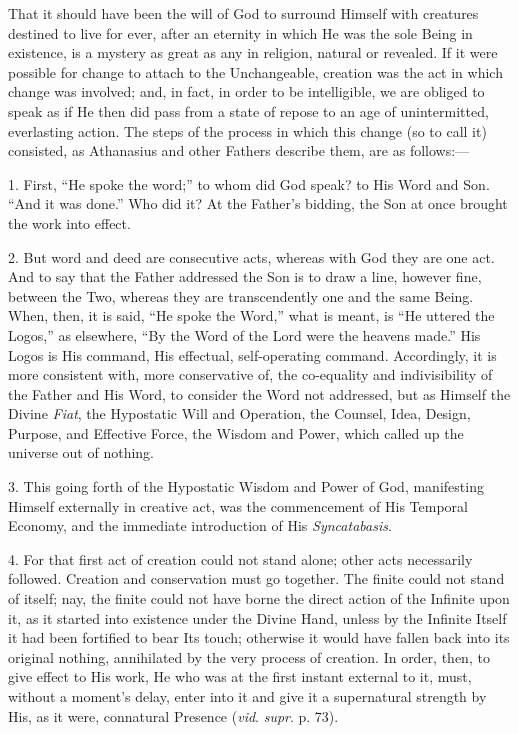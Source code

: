 That it should have been the will of God to surround Himself with
creatures destined to live for ever, after an eternity in which He was
the sole Being in existence, is a mystery as great as any in religion,
natural or revealed. If it were possible for change to attach to the
Unchangeable, creation was the act in which change was involved; and, in fact, in order to be intelligible, we are obliged to speak as
if He then did pass from a state of repose to an age of unintermitted,
everlasting action. The steps of the process in which this change (so
to call it) consisted, as Athanasius and other Fathers describe them,
are as follows:—

1. First, ``He spoke the word;'' to whom did God speak? to
His Word and Son. ``And it was done.'' Who did it? At the
Father's bidding, the Son at once brought the work into effect.

2. But word and deed are consecutive acts, whereas with God they
are one act. And to say that the Father addressed the Son is to draw a
line, however fine, between the Two, whereas they are transcendently
one and the same Being. When, then, it is said, ``He spoke the
Word,'' what is meant, is ``He uttered the Logos,'' as
elsewhere, ``By the Word of the Lord were the heavens made.''
His Logos is His command, His effectual, self-operating command.
Accordingly, it is more consistent with, more conservative of, the
co-equality and indivisibility of the Father and His Word, to consider
the Word not addressed, but as Himself the Divine \emph{Fiat}, the
Hypostatic Will and Operation, the Counsel, Idea, Design, Purpose, and
Effective Force, the Wisdom and Power, which called up the universe
out of nothing.

3. This going forth of the Hypostatic Wisdom and Power of God,
manifesting Himself externally in creative act, was the commencement
of His Temporal Economy, and the immediate introduction of His \emph{Syncatabasis}.

4. For that first act of creation could not stand alone; other acts necessarily followed. Creation and conservation must go
together. The finite could not stand of itself; nay, the finite could
not have borne the direct action of the Infinite upon it, as it
started into existence under the Divine Hand, unless by the Infinite
Itself it had been fortified to bear Its touch; otherwise it would
have fallen back into its original nothing, annihilated by the very
process of creation. In order, then, to give effect to His work, He
who was at the first instant external to it, must, without a moment's
delay, enter into it and give it a supernatural strength by His, as it
were, connatural Presence (\emph{vid}. \emph{supr}. p. 73).

